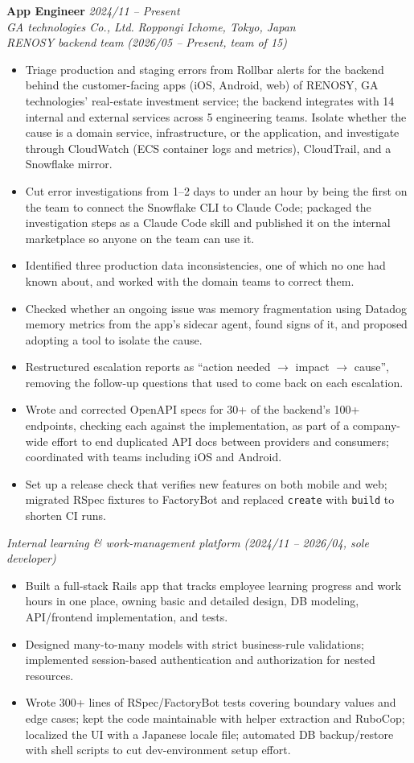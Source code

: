 \documentclass[10pt,letterpaper]{article}
\newcommand{\role}[4]{%
  \textbf{#1} \hfill \textit{#3}\\
  \textit{#2} \hfill \textit{#4}\\[0pt]
}
\begin{document}
\role{App Engineer}{GA technologies Co., Ltd.}{2024/11 -- Present}{Roppongi Ichome, Tokyo, Japan}
\textit{RENOSY backend team (2026/05 -- Present, team of 15)}
\begin{itemize}
  \item Triage production and staging errors from Rollbar alerts for the backend behind the
    customer-facing apps (iOS, Android, web) of RENOSY, GA technologies' real-estate investment
    service; the backend integrates with 14 internal and external services across 5 engineering
    teams. Isolate whether the cause is a domain service, infrastructure, or the application, and
    investigate through CloudWatch (ECS container logs and metrics), CloudTrail, and a Snowflake
    mirror.
  \item Cut error investigations from 1--2 days to under an hour by being the first on the team to
    connect the Snowflake CLI to Claude Code; packaged the investigation steps as a Claude Code skill
    and published it on the internal marketplace so anyone on the team can use it.
  \item Identified three production data inconsistencies, one of which no one had known about, and
    worked with the domain teams to correct them.
  \item Checked whether an ongoing issue was memory fragmentation using Datadog memory metrics from
    the app's sidecar agent, found signs of it, and proposed adopting a tool to isolate the cause.
  \item Restructured escalation reports as ``action needed $\rightarrow$ impact $\rightarrow$
    cause'', removing the follow-up questions that used to come back on each escalation.
  \item Wrote and corrected OpenAPI specs for 30+ of the backend's 100+ endpoints, checking each against
    the implementation, as part of a company-wide effort to end duplicated API docs between
    providers and consumers; coordinated with teams including iOS and Android.
  \item Set up a release check that verifies new features on both mobile and web; migrated RSpec
    fixtures to FactoryBot and replaced \texttt{create} with \texttt{build} to shorten CI runs.
\end{itemize}
\textit{Internal learning \& work-management platform (2024/11 -- 2026/04, sole developer)}
\begin{itemize}
  \item Built a full-stack Rails app that tracks employee learning progress and work hours in one
    place, owning basic and detailed design, DB modeling, API/frontend implementation, and tests.
  \item Designed many-to-many models with strict business-rule validations; implemented
    session-based authentication and authorization for nested resources.
  \item Wrote 300+ lines of RSpec\slash FactoryBot tests covering boundary values and edge cases; kept the
    code maintainable with helper extraction and RuboCop; localized the UI with a Japanese locale
    file; automated DB backup\slash restore with shell scripts to cut dev-environment setup effort.
\end{itemize}
\end{document}
